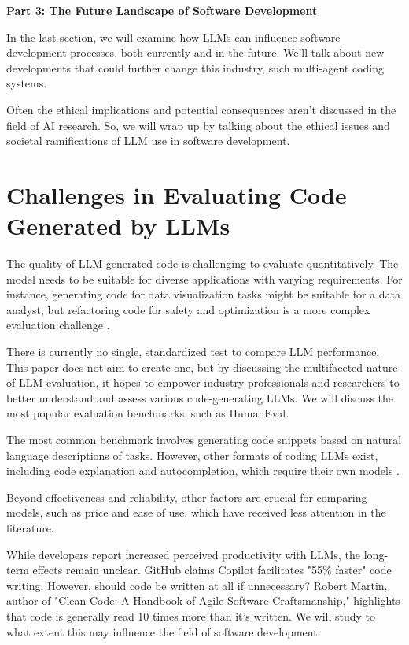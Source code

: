 \textbf{Part 3: The Future Landscape of Software Development}

In the last section, we will examine how LLMs can influence software development processes, both currently and in the future. We'll talk about new developments that could further change this industry, such multi-agent coding systems.  

Often the ethical implications and potential consequences aren’t discussed in the field of AI research. So, we will wrap up by talking about the ethical issues and societal ramifications of LLM use in software development.

\section{Challenges in Evaluating Code Generated by LLMs} 

The quality of LLM-generated code is challenging to evaluate quantitatively. The model needs to be suitable for diverse applications with varying requirements. For instance, generating code for data visualization tasks might be suitable for a data analyst, but refactoring code for safety and optimization is a more complex evaluation challenge \cite{fan2023large, peng2023impact}. 

There is currently no single, standardized test to compare LLM performance. This paper does not aim to create one, but by discussing the multifaceted nature of LLM evaluation, it hopes to empower industry professionals and researchers to better understand and assess various code-generating LLMs. We will discuss the most popular evaluation benchmarks, such as HumanEval.\cite{chen2021evaluating}

The most common benchmark involves generating code snippets based on natural language descriptions of tasks. However, other formats of coding LLMs exist, including code explanation and autocompletion, which require their own models \cite{fan2023large}.

Beyond effectiveness and reliability, other factors are crucial for comparing models, such as price and ease of use, which have received less attention in the literature. 

While developers report increased perceived productivity with LLMs, the long-term effects remain unclear.\cite{codingoncopilot2023} GitHub claims Copilot facilitates "55\% faster" code writing. However, should code be written at all if unnecessary? Robert Martin, author of "Clean Code: A Handbook of Agile Software Craftsmanship," highlights that code is generally read 10 times more than it's written. We will study to what extent this may influence the field of software development.


